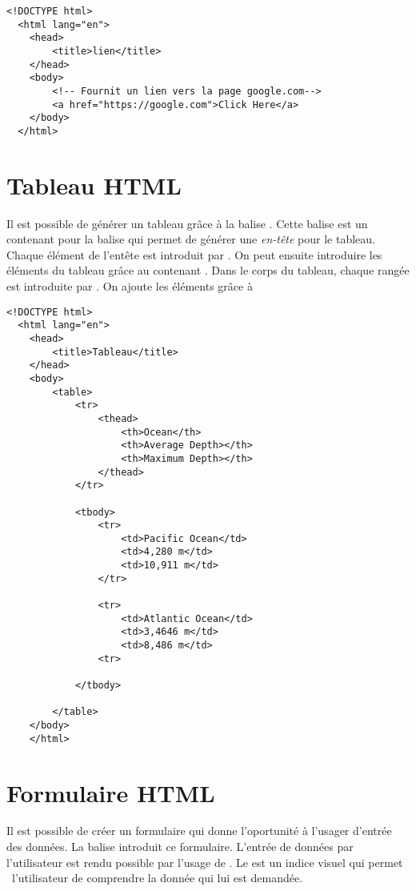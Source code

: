 \documentclass{report}
\begin{document}
\begin{ExampleDdHTML*}{}{}
  \begin{lstlisting}[style=HTMLDraculaDark]
  <!DOCTYPE html>
  <html lang="en">
	<head>
		<title>lien</title>
	</head>
	<body>
		<!-- Fournit un lien vers la page google.com-->
		<a href="https://google.com">Click Here</a>
	</body>
  </html>
  \end{lstlisting}
\end{ExampleDdHTML*}



\section{Tableau HTML}
\noindent Il est possible de générer un tableau grâce à la balise . Cette balise est un contenant pour la balise  qui 
permet de générer une \textit{en-tête} pour le tableau. Chaque élément de l'entête est introduit par
. On peut ensuite introduire les éléments du tableau grâce au 
contenant . Dans le corps du tableau, chaque rangée est
introduite par . On ajoute les éléments grâce à 
\begin{ExampleDdHTML*}{}{}
  \begin{lstlisting}[style=HTMLDraculaDark] 
  <!DOCTYPE html>
  <html lang="en">
	<head>
		<title>Tableau</title>
	</head>
	<body>
		<table>
			<tr>
				<thead>
					<th>Ocean</th>
					<th>Average Depth></th>
					<th>Maximum Depth></th>
				</thead>
			</tr>

			<tbody>
				<tr>
					<td>Pacific Ocean</td>
					<td>4,280 m</td>
					<td>10,911 m</td>
				</tr>

				<tr>
					<td>Atlantic Ocean</td>
					<td>3,4646 m</td>
					<td>8,486 m</td>
				<tr>
				
			</tbody>

		</table>
	</body>
	</html>
  \end{lstlisting}
\end{ExampleDdHTML*}

\section{Formulaire HTML}
\noindent Il est possible de créer un formulaire qui donne l'oportunité à l'usager d'entrée des données. 
La balise  introduit ce formulaire. L'entrée de données
par l'utilisateur est rendu possible par l'usage de .
Le  est un indice visuel qui permet \ l'utilisateur de 
comprendre la donnée qui lui est demandée. 
\end{document}
